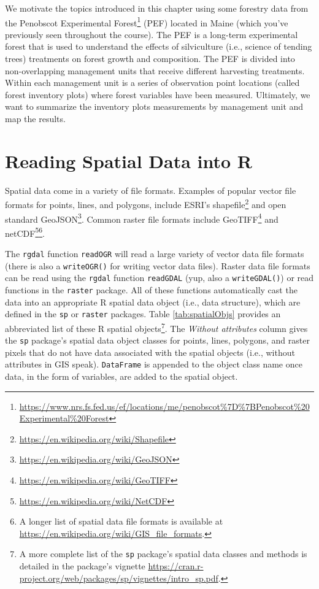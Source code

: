 \documentclass[]{krantz}
\renewcommand{\href}[2]{#2\footnote{\url{#1}}}
\theoremstyle{definition}
\theoremstyle{definition}
\theoremstyle{definition}
\theoremstyle{remark}
\begin{document}
We motivate the topics introduced in this chapter using some forestry
data from the
\href{https://www.nrs.fs.fed.us/ef/locations/me/penobscot\%7D\%7BPenobscot\%20Experimental\%20Forest}{Penobscot
Experimental Forest} (PEF) located in Maine (which you've previously
seen throughout the course). The PEF is a long-term experimental forest
that is used to understand the effects of silviculture (i.e., science of
tending trees) treatments on forest growth and composition. The PEF is
divided into non-overlapping management units that receive different
harvesting treatments. Within each management unit is a series of
observation point locations (called forest inventory plots) where forest
variables have been measured. Ultimately, we want to summarize the
inventory plots measurements by management unit and map the results.

\section{Reading Spatial Data into R}\label{reading-spatial-data-into-r}

Spatial data come in a variety of file formats. Examples of popular
vector file formats for points, lines, and polygons, include ESRI's
\href{https://en.wikipedia.org/wiki/Shapefile}{shapefile} and open
standard \href{https://en.wikipedia.org/wiki/GeoJSON}{GeoJSON}. Common
raster file formats include
\href{https://en.wikipedia.org/wiki/GeoTIFF}{GeoTIFF} and
\href{https://en.wikipedia.org/wiki/NetCDF}{netCDF}\footnote{A longer
  list of spatial data file formats is available at
  \url{https://en.wikipedia.org/wiki/GIS_file_formats}.}.

The \texttt{rgdal} function \texttt{readOGR} will read a large variety
of vector data file formats (there is also a \texttt{writeOGR()} for
writing vector data files). Raster data file formats can be read using
the \texttt{rgdal} function \texttt{readGDAL} (yup, also a
\texttt{writeGDAL()}) or read functions in the \texttt{raster} package.
All of these functions automatically cast the data into an appropriate R
spatial data object (i.e., data structure), which are defined in the
\texttt{sp} or \texttt{raster} packages. Table \ref{tab:spatialObjs}
provides an abbreviated list of these R spatial objects\footnote{A more
  complete list of the \texttt{sp} package's spatial data classes and
  methods is detailed in the package's vignette
  \url{https://cran.r-project.org/web/packages/sp/vignettes/intro_sp.pdf}.}.
The \emph{Without attributes }column gives the \texttt{sp} package's
spatial data object classes for points, lines, polygons, and raster
pixels that do not have data associated with the spatial objects (i.e.,
without attributes in GIS speak). \texttt{DataFrame} is appended to the
object class name once data, in the form of variables, are added to the
spatial object.
\end{document}
